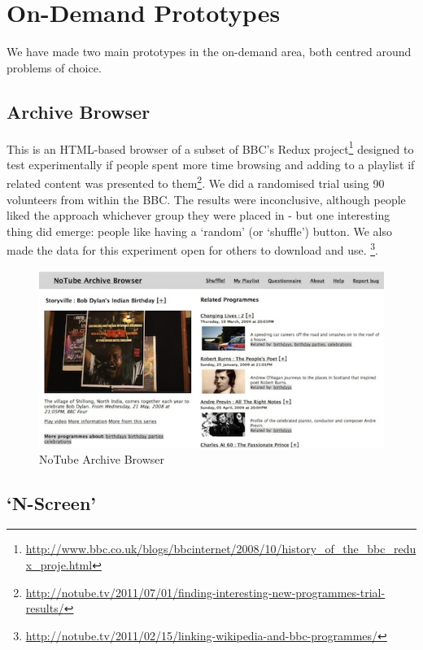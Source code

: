 \documentclass{notube}
\begin{document}
\section{On-Demand Prototypes}

We have made two main prototypes in the on-demand area, both centred around problems of choice.

\subsection{Archive Browser}

This is an HTML-based browser of a subset of BBC's Redux project\footnote{\url{http://www.bbc.co.uk/blogs/bbcinternet/2008/10/history_of_the_bbc_redux_proje.html}} designed to test experimentally if people spent more time browsing and adding to a playlist if related content was presented to them\footnote{\url{http://notube.tv/2011/07/01/finding-interesting-new-programmes-trial-results/}}. We did a randomised trial using 90 volunteers from within the BBC. The results were inconclusive, although people liked the approach whichever group they were placed in -  but one interesting thing did emerge: people like having a `random' (or `shuffle') button. We also made the data for this experiment open for others to download and use. \footnote{\url{http://notube.tv/2011/02/15/linking-wikipedia-and-bbc-programmes/}}.

\begin{figure}[htbp]
\begin{center}
\includegraphics[width=6in]{images/notube-archive-browser.jpg}
\caption{NoTube Archive Browser} \label{fig:archive}
\end{center}
\end{figure} 


\subsection{`N-Screen'}
\end{document}
